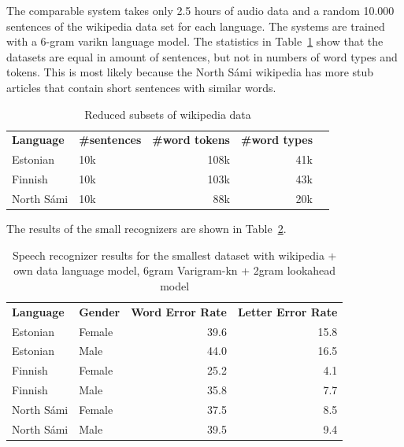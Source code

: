 \documentclass[b5paper]{article}
\newcommand{\ns}{{North Sámi }}
\begin{document}
The comparable system takes only 2.5 hours of audio data and a random 10.000 sentences of the wikipedia data set for each language. The systems are trained with a 6-gram varikn language model. The statistics in Table~\ref{tbl:lmdatacomp_small} show that the datasets are equal in amount of sentences, but not in numbers of word types and tokens. This is most likely because the \ns wikipedia has more stub articles that contain short sentences with similar words.


\begin{table}[h!]

\centering
\begin{tabular}{llrrr}
\textbf{Language} & \textbf{\#sentences} & \textbf{\#word tokens} & \textbf{\#word types}\\
Estonian &   10k & 108k & 41k \\
 Finnish &   10k  & 103k & 43k \\
 \ns &  10k & 88k & 20k\\
\end{tabular}
\caption{Reduced subsets of wikipedia data\label{tbl:lmdatacomp_small}}
\end{table}

The results of the small recognizers are shown in Table~\ref{tbl:resultssmallcomp}.

\begin{table}[h!]

\centering
\begin{tabular}{llrr}
\textbf{Language} & \textbf{Gender} & \textbf{Word Error Rate} & \textbf{Letter Error Rate}\\
Estonian & Female & 39.6 & 15.8 \\
Estonian & Male & 44.0 & 16.5\\
Finnish & Female & 25.2 &4.1 \\
Finnish & Male &  35.8 & 7.7 \\
\ns & Female & 37.5 & 8.5 \\
\ns & Male & 39.5 & 9.4 \\
\end{tabular}
\caption{Speech recognizer results for the smallest dataset with wikipedia + own data language model, 6gram Varigram-kn + 2gram lookahead model \label{tbl:resultssmallcomp}}
\end{table}
\end{document}

